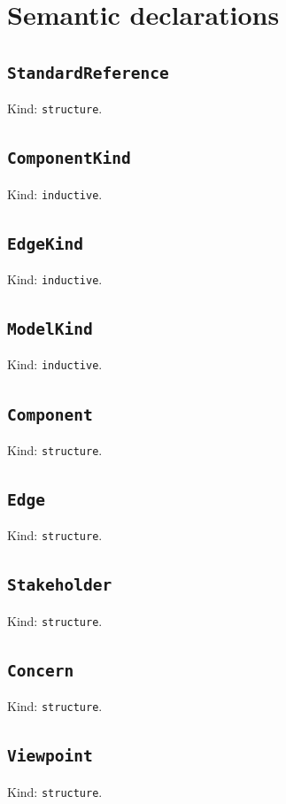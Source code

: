 \documentclass[11pt]{article}
\begin{document}
\section*{Semantic declarations}
\subsection*{\texttt{StandardReference}}
\noindent Kind: \texttt{structure}.\par
\subsection*{\texttt{ComponentKind}}
\noindent Kind: \texttt{inductive}.\par
\subsection*{\texttt{EdgeKind}}
\noindent Kind: \texttt{inductive}.\par
\subsection*{\texttt{ModelKind}}
\noindent Kind: \texttt{inductive}.\par
\subsection*{\texttt{Component}}
\noindent Kind: \texttt{structure}.\par
\subsection*{\texttt{Edge}}
\noindent Kind: \texttt{structure}.\par
\subsection*{\texttt{Stakeholder}}
\noindent Kind: \texttt{structure}.\par
\subsection*{\texttt{Concern}}
\noindent Kind: \texttt{structure}.\par
\subsection*{\texttt{Viewpoint}}
\noindent Kind: \texttt{structure}.\par
\end{document}
